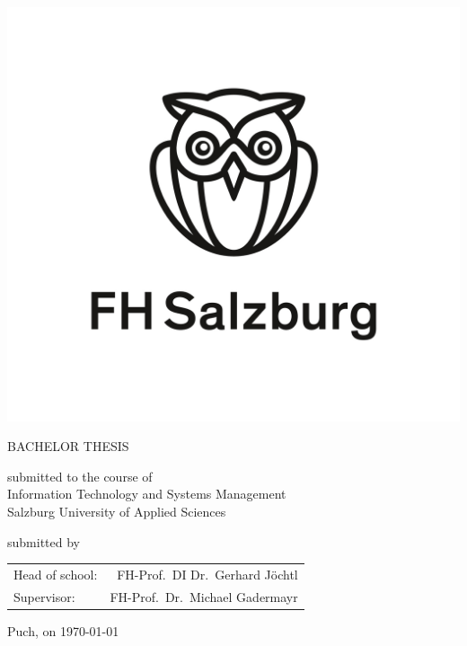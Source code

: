 
\begin{center}
\vspace{0cm}
\includegraphics{./img/fhs_logo.jpg}\par
\vspace{1cm}
{
    {\LARGE BACHELOR THESIS\par}
}
\vspace{1cm}
{\Large \textbf{\thetitle}\par}
\vspace{2.5cm}
submitted to the course of\\
Information Technology and Systems Management\\
Salzburg University of Applied Sciences\par
\vspace{2.5cm}
submitted by\\
\textbf{\theauthor}\par
\vspace{2.5cm}

\begin{tabular}{lr}
    Head of school: & FH-Prof.\ DI Dr.\ Gerhard Jöchtl\\
    Supervisor: & FH-Prof.\ Dr.\ Michael Gadermayr\\
\end{tabular}
\par
\vfill
Puch, on \today
\end{center}
\restoregeometry
